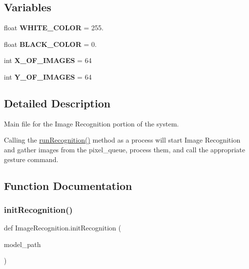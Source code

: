 \subsection*{Variables}
\begin{DoxyCompactItemize}
\item 
\mbox{\label{namespaceImageRecognition_ac1f31ba6524df5072a858f6cd67fd828}} 
float {\bfseries W\+H\+I\+T\+E\+\_\+\+C\+O\+L\+OR} = 255.
\item 
\mbox{\label{namespaceImageRecognition_a1b8728679ac6fffafc53d344dcb48b91}} 
float {\bfseries B\+L\+A\+C\+K\+\_\+\+C\+O\+L\+OR} = 0.
\item 
\mbox{\label{namespaceImageRecognition_a5a61b5e0edda4be185bdd9e43c49b940}} 
int {\bfseries X\+\_\+\+O\+F\+\_\+\+I\+M\+A\+G\+ES} = 64
\item 
\mbox{\label{namespaceImageRecognition_a8285c4b5f406b6b3dd9291271439c643}} 
int {\bfseries Y\+\_\+\+O\+F\+\_\+\+I\+M\+A\+G\+ES} = 64
\end{DoxyCompactItemize}


\subsection{Detailed Description}
Main file for the Image Recognition portion of the system. 

Calling the \hyperlink{namespaceImageRecognition_a9709415793e740c3fb251cd22e053c17}{run\+Recognition()} method as a process will start Image Recognition and gather images from the pixel\+\_\+queue, process them, and call the appropriate gesture command. 

\subsection{Function Documentation}
\mbox{\label{namespaceImageRecognition_ae839052fe2fa16ffa7804966c331f792}} 
\subsubsection{\texorpdfstring{init\+Recognition()}{initRecognition()}}
{\footnotesize\ttfamily def Image\+Recognition.\+init\+Recognition (\begin{DoxyParamCaption}\item[{}]{model\+\_\+path }\end{DoxyParamCaption})}



